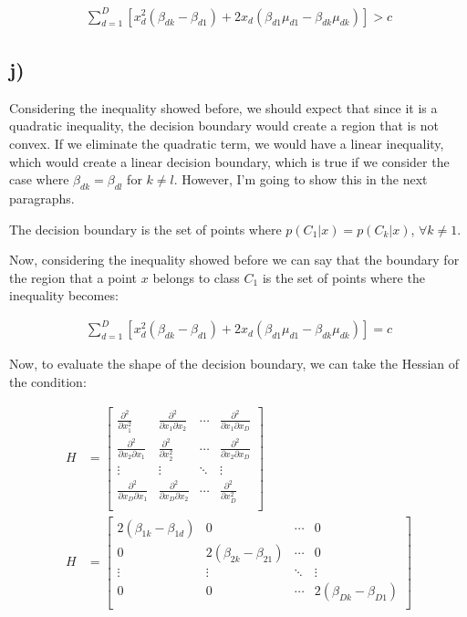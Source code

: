 \documentclass[12pt,a4paper,oneside]{paper}
\begin{document}
\begin{align*}
    \sum_{d=1}^{D} \left[ x_d^2 (\beta_{dk} - \beta_{d1}) + 2 x_d (\beta_{d1} \mu_{d1} - \beta_{dk} \mu_{dk})\right] > c
\end{align*}

\subsection*{j)}

Considering the inequality showed before, we should expect that since it is a quadratic inequality, the decision boundary would create a region that is not convex.
If we eliminate the quadratic term, we would have a linear inequality, which would create a linear decision boundary, which is true if we consider the case where $\beta_{dk} = \beta_{dl}$ for $k \neq l$.
However, I'm going to show this in the next paragraphs.

The decision boundary is the set of points where $p(C_1 | x) = p(C_k | x)$, $\forall k \neq 1$.

Now, considering the inequality showed before we can say that the boundary for the region that a point $x$ belongs to class $C_1$ is the set of points where the inequality becomes:

\begin{align*}
    \sum_{d=1}^{D} \left[ x_d^2 (\beta_{dk} - \beta_{d1}) + 2 x_d (\beta_{d1} \mu_{d1} - \beta_{dk} \mu_{dk})\right] = c
\end{align*}

Now, to evaluate the shape of the decision boundary, we can take the Hessian of the condition:

\begin{align*}
    H &= \begin{bmatrix}
        \frac{\partial^2}{\partial x_1^2} & \frac{\partial^2}{\partial x_1 \partial x_2} & \cdots & \frac{\partial^2}{\partial x_1 \partial x_D} \\
        \frac{\partial^2}{\partial x_2 \partial x_1} & \frac{\partial^2}{\partial x_2^2} & \cdots & \frac{\partial^2}{\partial x_2 \partial x_D} \\
        \vdots & \vdots & \ddots & \vdots \\
        \frac{\partial^2}{\partial x_D \partial x_1} & \frac{\partial^2}{\partial x_D \partial x_2} & \cdots & \frac{\partial^2}{\partial x_D^2} \\
    \end{bmatrix} \\
    H &= \begin{bmatrix}
        2 (\beta_{1k} - \beta_{1d}) & 0 & \cdots & 0 \\
        0 & 2 (\beta_{2k} - \beta_{21}) & \cdots & 0 \\
        \vdots & \vdots & \ddots & \vdots \\
        0 & 0 & \cdots & 2 (\beta_{Dk} - \beta_{D1}) \\
    \end{bmatrix}
\end{align*}
\end{document}
